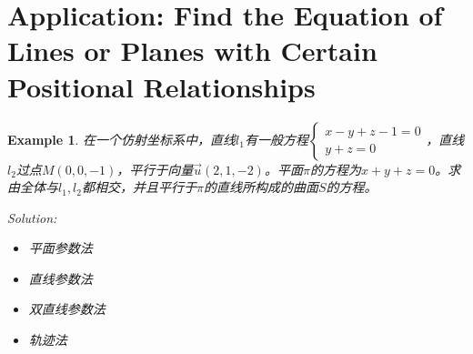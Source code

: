 \documentclass[onecolumn]{ctexart}
\newtheorem{example}{Example}
\begin{document}
\section{Application: Find the Equation of Lines or Planes with Certain Positional Relationships}

\begin{example}
  在一个仿射坐标系中，直线$l_1$有一般方程$
  \begin{cases}
    x - y + z - 1 = 0 \\
    y + z = 0
  \end{cases}$，直线$l_2$过点$M(0, 0, -1)$，平行于向量$\vec{u}(2, 1, -2)$。平面$\pi$的方程为$x + 
  y + z = 0$。求由全体与$l_1, l_2$都相交，并且平行于$\pi$的直线所构成的曲面$S$的方程。

  Solution:
  \begin{itemize}
    \item 平面参数法
    \item 直线参数法
    \item 双直线参数法
    \item 轨迹法
  \end{itemize}
\end{example}
\end{document}
